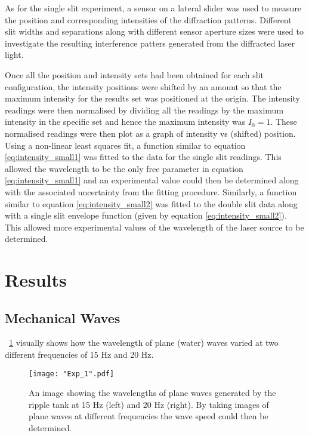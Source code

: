 \documentclass{article}
\newcommand{\figref}[2][\figurename~]{#1\ref{#2}}
\begin{document}
\newpage
\vspace{2mm}
\noindent
As for the single slit experiment, a sensor on a lateral slider was used to measure the position and corresponding intensities of the diffraction patterns. Different slit widths and separations along with different sensor aperture sizes were used to investigate the resulting interference patters generated from the diffracted laser light.

\vspace{2mm}
\noindent
Once all the position and intensity sets had been obtained for each slit configuration, the intensity positions were shifted by an amount so that the maximum intensity for the results set was positioned at the origin. The intensity readings were then normalised by dividing all the readings by the maximum intensity in the specific set and hence the maximum intensity was $I_0 = 1$. These normalised readings were then plot as a graph of intensity vs (shifted) position. Using a non-linear least squares fit, a function similar to equation \eqref{eq:intensity_small1} was fitted to the data for the single slit readings. This allowed the wavelength to be the only free parameter in equation \eqref{eq:intensity_small1} and an experimental value could then be determined along with the associated uncertainty from the fitting procedure. Similarly, a function similar to equation \eqref{eq:intensity_small2} was fitted to the double slit data along with a single slit envelope function (given by equation \eqref{eq:intensity_small2}). This allowed more experimental values of the wavelength of the laser source to be determined.

\section{Results}
\label{sec:results}

\subsection{Mechanical Waves}
\label{ssec:ripple-results}

\figref{fig:wavelength_image} visually shows how the wavelength of plane (water) waves varied at two different frequencies of 15 Hz and 20 Hz.

\begin{figure}[h]
\centering
\texttt{[image: "Exp\_1".pdf]}
\caption{An image showing the wavelengths of plane waves generated by the ripple tank at 15 Hz (left) and 20 Hz (right). By taking images of plane waves at different frequencies the wave speed could then be determined.}
\label{fig:wavelength_image}
\end{figure}
\end{document}
